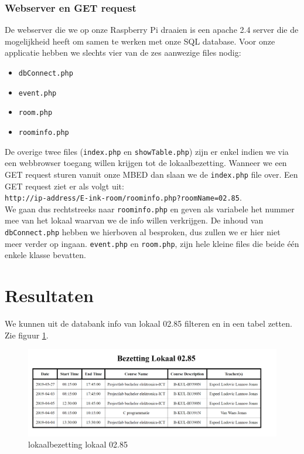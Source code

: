 \documentclass[a4paper,kul]{kulakarticle} %
\begin{document}
\subsubsection{Webserver en GET request}
De webserver die we op onze Raspberry Pi draaien is een apache 2.4 server die de mogelijkheid heeft om samen te werken met onze SQL database. Voor onze applicatie hebben we slechts vier van de zes aanwezige files nodig: 
\begin{itemize}
	\item \verb|dbConnect.php|
	\item \verb|event.php|
	\item \verb|room.php|
	\item \verb|roominfo.php|
\end{itemize}
De overige twee files (\verb|index.php| en \verb|showTable.php|) zijn er enkel indien we via een webbrowser toegang willen krijgen tot de lokaalbezetting. Wanneer we een GET request sturen vanuit onze MBED dan slaan we de \verb|index.php| file over. Een GET request ziet er als volgt uit: \\ \verb|http://ip-address/E-ink-room/roominfo.php?roomName=02.85|. \\ We gaan dus rechtstreeks naar \verb|roominfo.php| en geven als variabele het nummer mee van het lokaal waarvan we de info willen verkrijgen.  De inhoud van \verb|dbConnect.php| hebben we hierboven al besproken, dus zullen we er hier niet meer verder op ingaan. \verb|event.php| en \verb|room.php|, zijn hele kleine files die beide \'{e}\'{e}n enkele klasse bevatten.
\newpage

\section{Resultaten}

We kunnen uit de databank info van lokaal 02.85 filteren en in een tabel zetten. Zie figuur \ref{fig:vboutput}.

\begin{figure}[h]
	\centering
	\includegraphics[width=1\textwidth]{vbDatabank}
	\caption{lokaalbezetting lokaal 02.85}
	\label{fig:vboutput}
\end{figure}
\end{document}
